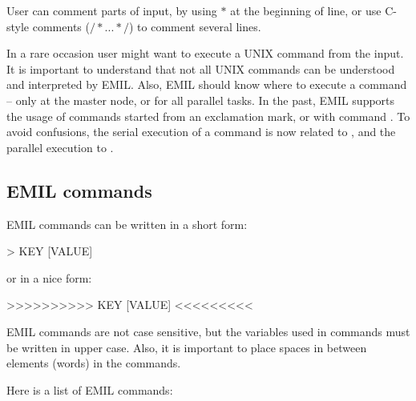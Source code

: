 User can comment parts of input, by using $*$ at the beginning of line,
or use C-style comments ($ /* ... */ $) to comment several lines.

In a rare occasion user might want to execute a UNIX command from
the input. It is important to understand that not all UNIX commands
can be understood and interpreted by EMIL. Also, EMIL should know
where to execute a command -- only at the master node, or for all
parallel tasks. In the past, EMIL supports the usage of commands
started from an  exclamation mark, or with command .
To avoid confusions, the serial execution of a command is now related to ,
and the parallel execution to .


\subsection{EMIL commands}
\label{UG:sec:emil_commands}

EMIL commands can be written in a short form:
\begin{sourcelisting}
> KEY [VALUE]
\end{sourcelisting}
or in a nice form:
\begin{sourcelisting}
>>>>>>>>>>  KEY  [VALUE]  <<<<<<<<<
\end{sourcelisting}

EMIL commands are not case sensitive, but the variables used in commands must be written in upper case.
Also, it is important to place spaces in between elements (words) in the commands.

Here is a list of EMIL commands:



